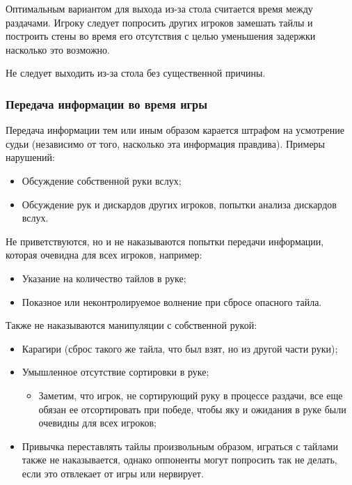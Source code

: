 Оптимальным вариантом для выхода из-за стола считается время между раздачами. Игроку следует попросить других игроков замешать тайлы и построить стены во время его отсутствия с целью уменьшения задержки насколько это возможно.

Не следует выходить из-за стола без существенной причины.

\subsubsection{Передача информации во время игры}

Передача информации тем или иным образом карается штрафом на усмотрение судьи (независимо от того, насколько эта информация правдива). Примеры нарушений:
\begin{itemize}
	\item Обсуждение собственной руки вслух;
	\item Обсуждение рук и дискардов других игроков, попытки анализа дискардов вслух.
\end{itemize}

Не приветствуются, но и не наказываются попытки передачи информации, которая очевидна для всех игроков, например:
\begin{itemize}
	\item Указание на количество тайлов в руке;
	\item Показное или неконтролируемое волнение при сбросе опасного тайла.
\end{itemize}

Также не наказываются манипуляции с собственной рукой:
\begin{itemize}
	\item Карагири (сброс такого же тайла, что был взят, но из другой части руки);
	\item Умышленное отсутствие сортировки в руке;
	\begin{itemize}
		\item Заметим, что игрок, не сортирующий руку в процессе раздачи, все еще обязан ее отсортировать при победе, чтобы яку и ожидания в руке были очевидны для всех игроков;
	\end{itemize}
	\item Привычка переставлять тайлы произвольным образом, играться с тайлами также не наказывается, однако оппоненты могут попросить так не делать, если это отвлекает от игры или нервирует.
\end{itemize}

